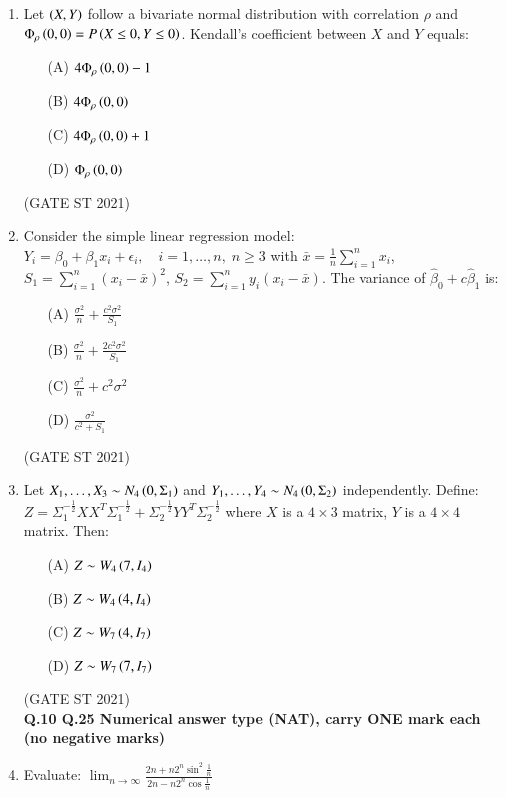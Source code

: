 \documentclass[journal,12pt,onecolumn]{IEEEtran}
\theoremstyle{remark}
\begin{document}
\begin{enumerate}
\item
Let $\left(X,Y\right)$ follow a bivariate normal distribution with correlation $\rho$ and $\Phi_\rho\left(0,0\right)= P\left(X \leq 0, Y \leq 0\right)$.  
Kendall's coefficient between $X$ and $Y$ equals:
\begin{enumerate}
\item[(A)] $4\Phi_\rho\left(0,0\right) - 1$
\item[(B)] $4\Phi_\rho\left(0,0\right)$
\item[(C)] $4\Phi_\rho\left(0,0\right) + 1$
\item[(D)] $\Phi_\rho\left(0,0\right)$
\end{enumerate}
\hfill (GATE ST 2021) \\

\item
Consider the simple linear regression model:
$
Y_i = \beta_0 + \beta_1 x_i + \epsilon_i, \quad i = 1, \dots, n, \; n \geq 3
$
with $\bar{x} = \frac{1}{n} \sum_{i=1}^n x_i$, $S_1 = \sum_{i=1}^n (x_i - \bar{x})^2$, $S_2 = \sum_{i=1}^n y_i(x_i - \bar{x})$.  
The variance of $\hat{\beta}_0 + c \hat{\beta}_1$ is:
\begin{enumerate}
\item[(A)] $\frac{\sigma^2}{n} + \frac{c^2\sigma^2}{S_1}$
\item[(B)] $\frac{\sigma^2}{n} + \frac{2c^2\sigma^2}{S_1}$
\item[(C)] $\frac{\sigma^2}{n} + c^2\sigma^2$
\item[(D)] $\frac{\sigma^2}{c^2 + S_1}$
\end{enumerate}
\hfill (GATE ST 2021) \\

 

\item
Let $X_1,\dots,X_3 \sim N_4\left(0,\Sigma_1\right)$ and $Y_1,\dots,Y_4 \sim N_4\left(0,\Sigma_2\right)$ independently.  
Define:
$
Z = \Sigma_1^{-\frac12}XX^T\Sigma_1^{-\frac12} + \Sigma_2^{-\frac12}YY^T\Sigma_2^{-\frac12}
$
where $X$ is a $4\times 3$ matrix, $Y$ is a $4\times 4$ matrix.  
Then:
\begin{enumerate}
\item[(A)] $Z \sim W_4\left(7, I_4\right)$
\item[(B)] $Z \sim W_4\left(4, I_4\right)$
\item[(C)] $Z \sim W_7\left(4, I_7\right)$
\item[(D)] $Z \sim W_7\left(7, I_7\right)$
\end{enumerate}
\hfill (GATE ST 2021) \\

\textbf{Q.10 \text{-} Q.25 Numerical answer type (NAT), carry ONE mark each (no negative marks)} \\
 \item
Evaluate:
$
\lim_{n \to \infty} \frac{2n + n 2^n \sin^2\frac{1}{n}}{2n - n 2^n \cos\frac{1}{n}}
$


\end{enumerate}
\end{document}
